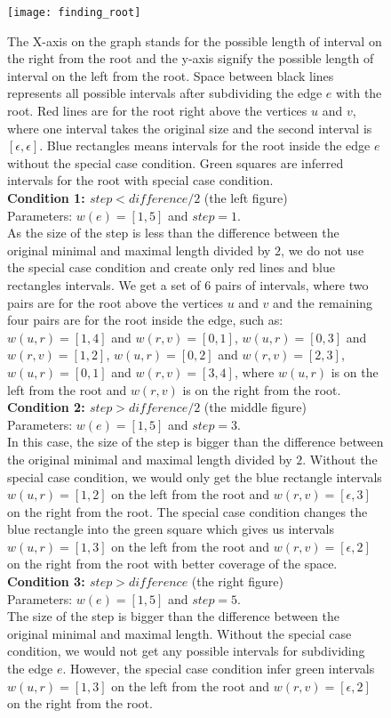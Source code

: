 \begin{figure}[!htbp]
	\centering
  	\texttt{[image: finding\_root]}
  	\caption[Rooting the gene tree]
  	{The X-axis on the graph stands for the possible length of interval on the right from the root and the y-axis signify the possible length of interval on the left from the root. Space between black lines represents all possible intervals after subdividing the edge $e$ with the root. Red lines are for the root right above the vertices $u$ and $v$, where one interval takes the original size and the second interval is $[\epsilon, \epsilon]$. Blue rectangles means intervals for the root inside the edge $e$ without the special case condition. Green squares are inferred intervals for the root with special case condition. \\
\textbf{Condition 1: $step < difference / 2$} (the left figure)\\
  	Parameters: $w(e) = [1, 5]$ and $step = 1$. \\
  	As the size of the step is less than the difference between the original minimal and maximal length divided by $2$, we do not use the special case condition and create only red lines and blue rectangles intervals. We get a set of 6 pairs of intervals, where two pairs are for the root above the vertices $u$ and $v$ and the remaining four pairs are for the root inside the edge, such as: $w(u, r) = [1, 4]$ and $w(r, v) = [0, 1]$, $w(u, r) = [0, 3]$ and $w(r, v) = [1, 2]$, $w(u, r) = [0, 2]$ and $w(r, v) = [2, 3]$, $w(u, r) = [0, 1]$ and $w(r, v) = [3, 4]$, where $w(u, r)$ is on the left from the root and $w(r, v)$ is on the right from the root.\\  	
  	\textbf{Condition 2: $step > difference / 2$} (the middle figure)\\
  	Parameters: $w(e) = [1, 5]$ and $step = 3$. \\
  	In this case, the size of the step is bigger than the difference between the original minimal and maximal length divided by $2$. Without the special case condition, we would only get the blue rectangle intervals $w(u,r)=[1,2]$ on the left from the root and $w(r,v)=[\epsilon, 3]$ on the right from the root. The special case condition changes the blue rectangle into the green square which gives us intervals $w(u, r) = [1, 3]$ on the left from the root and $w(r, v) = [\epsilon, 2]$ on the right from the root with better coverage of the space.\\
  	\textbf{Condition 3: $step > difference$} (the right figure)\\
  	Parameters: $w(e) = [1, 5]$ and $step = 5$. \\
  	The size of the step is bigger than the difference between the original minimal and maximal length. Without the special case condition, we would not get any possible intervals for subdividing the edge $e$. However, the special case condition infer green intervals $w(u, r) = [1, 3]$ on the left from the root and $w(r, v) = [\epsilon, 2]$ on the right from the root.}
  	\label{finding_root}
\end{figure}

